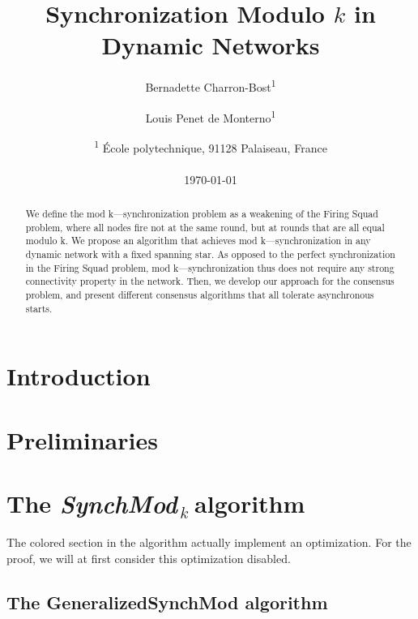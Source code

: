 \documentclass[11pt,letterpaper]{article}
\title{Synchronization Modulo $k$ in Dynamic Networks}
\author{Bernadette Charron-Bost\textsuperscript{1} \and Louis Penet de Monterno\textsuperscript{1}}
\date{\textsuperscript{1} \'Ecole polytechnique, 91128 Palaiseau, France\\~\\ \today}
\newcommand{\SM}{{\em SynchMod}$_{\,k}\ $}
\begin{document}
\maketitle
\tableofcontents

\begin{abstract}
	We define the mod k—synchronization problem as a weakening of the Firing Squad problem,
	where all nodes fire not at the same round, but at rounds that are all equal modulo k.
	We propose an algorithm that achieves mod k—synchronization  in any dynamic network
	with a fixed spanning star. As opposed to the perfect synchronization in
	the Firing Squad problem, mod k—synchronization thus does not require
	any strong connectivity property in the network. 
	Then, we develop our approach for the consensus problem,
	and present different consensus algorithms that all tolerate asynchronous starts.
\end{abstract}

\section{Introduction}

\section{Preliminaries}\label{sec:model}

\section{The \SM algorithm}

The colored section in the algorithm actually implement an optimization.
For the proof, we will at first consider this optimization disabled.

\subsection{The GeneralizedSynchMod algorithm}
\end{document}
